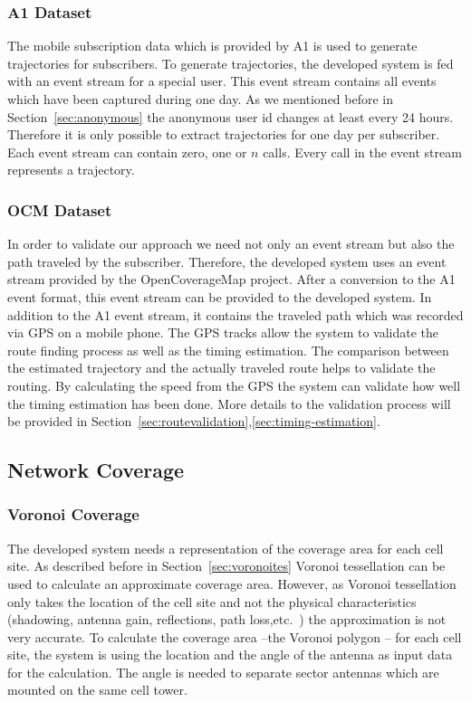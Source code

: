 \documentclass[master,english]{hgbthesis}
\begin{document}
\subsubsection{A1 Dataset}
The mobile subscription data which is provided by A1 is used to generate trajectories for subscribers. To generate trajectories, the developed system is fed with an event stream for a special user. This event stream contains all events which have been captured during one day. As we mentioned before in Section~\ref{sec:anonymous} the anonymous user id changes at least every 24 hours. Therefore it is only possible to extract trajectories for one day per subscriber. Each event stream can contain zero, one or $n$ calls. Every call in the event stream represents a trajectory.
\subsubsection{OCM Dataset}
In order to validate our approach we need not only an event stream but also the path traveled by the subscriber. Therefore, the developed system uses an event stream provided by the OpenCoverageMap project. After a conversion to the A1 event format, this event stream can be provided to the developed system. In addition to the A1 event stream, it contains the traveled path which was recorded via GPS on a mobile phone. The GPS tracks allow the system to validate the route finding process as well as the timing estimation. The comparison between the estimated trajectory and the actually traveled route helps to validate the routing. By calculating the speed from the GPS the system can validate how well the timing estimation has been done. More details to the validation process will be provided in Section~\ref{sec:routevalidation},\ref{sec:timing-estimation}.
\subsection{Network Coverage}
\subsubsection{Voronoi Coverage}
The developed system needs a representation of the coverage area for each cell site. As described before in Section~\ref{sec:voronoites} Voronoi tessellation can be used to calculate an approximate coverage area. However, as Voronoi tessellation only takes the location of the cell site and not the physical characteristics (shadowing, antenna gain, reflections, path loss,etc.\ ) the approximation is not very accurate. To calculate the coverage area --the Voronoi polygon -- for each cell site, the system is using the location and the angle of the antenna as input data for the calculation. The angle is needed to separate sector antennas which are mounted on the same cell tower.
\end{document}
